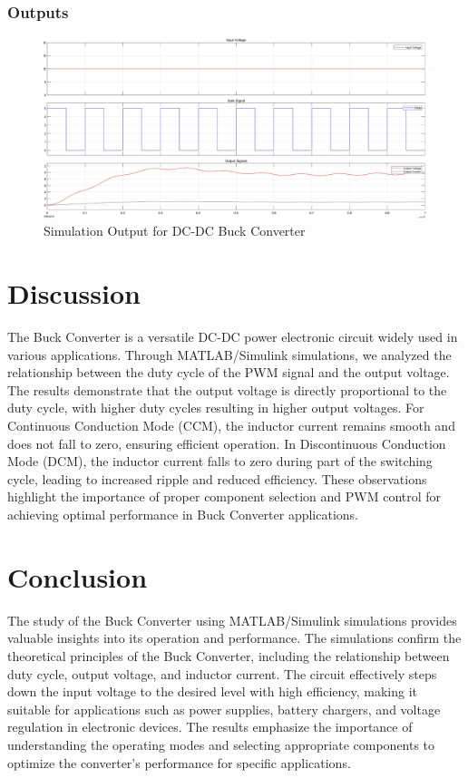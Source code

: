 \documentclass[12pt]{article}
\begin{document}
\subsubsection*{Outputs}
\begin{figure}[H]
    \centering
    \includegraphics[width=\textwidth]{output.jpeg}
    \caption{Simulation Output for DC-DC Buck Converter}
    \label{fig:rControlledNoDelay}
\end{figure}


\section*{Discussion}
The Buck Converter is a versatile DC-DC power electronic circuit widely used in various applications. Through MATLAB/Simulink simulations, we analyzed the relationship between the duty cycle of the PWM signal and the output voltage. The results demonstrate that the output voltage is directly proportional to the duty cycle, with higher duty cycles resulting in higher output voltages. For Continuous Conduction Mode (CCM), the inductor current remains smooth and does not fall to zero, ensuring efficient operation. In Discontinuous Conduction Mode (DCM), the inductor current falls to zero during part of the switching cycle, leading to increased ripple and reduced efficiency. These observations highlight the importance of proper component selection and PWM control for achieving optimal performance in Buck Converter applications.

\section*{Conclusion}
The study of the Buck Converter using MATLAB/Simulink simulations provides valuable insights into its operation and performance. The simulations confirm the theoretical principles of the Buck Converter, including the relationship between duty cycle, output voltage, and inductor current. The circuit effectively steps down the input voltage to the desired level with high efficiency, making it suitable for applications such as power supplies, battery chargers, and voltage regulation in electronic devices. The results emphasize the importance of understanding the operating modes and selecting appropriate components to optimize the converter's performance for specific applications.


\renewcommand{\bibname}{References}

\end{document}
